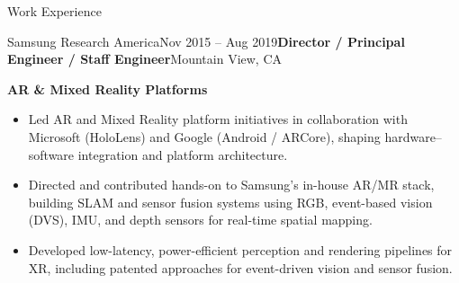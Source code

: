 \documentclass[
	10pt, %
]{resume} %
\begin{document}
\begin{rSection}{Work Experience}
\begin{rSubsection}{Samsung Research America}{Nov 2015 -- Aug 2019}{\textbf{Director / Principal Engineer / Staff Engineer}}{Mountain View, CA}
  \item[] \textbf{AR \& Mixed Reality Platforms}
  \begin{itemize}
\item Led AR and Mixed Reality platform initiatives in collaboration with Microsoft (HoloLens) and Google (Android / ARCore), shaping hardware–software integration and platform architecture.
\item Directed and contributed hands-on to Samsung’s in-house AR/MR stack, building SLAM and sensor fusion systems using RGB, event-based vision (DVS), IMU, and depth sensors for real-time spatial mapping.
\item Developed low-latency, power-efficient perception and rendering pipelines for XR, including patented approaches for event-driven vision and sensor fusion. \\ \\ \\
\end{itemize}
\end{rSubsection}

	 

\end{rSection}

\end{document}

